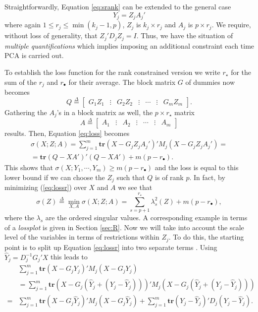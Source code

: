 \documentclass[article]{Z}
\newcommand{\defi}{\mathop{=}\limits^{\Delta}}
\begin{document}
Straightforwardly, Equation \ref{eq:srank} can be extended to the general case 
\begin{equation}
\label{E:res}
Y_j=Z_jA_j'
\end{equation}
where again $1 \leq r_j \leq \min{(k_j-1,p)}$, $Z_j$ is $k_j \times r_j$ and $A_j$ is $p \times r_j$. We require, without loss of generality, that
$Z_j'D_j^{}Z_j^{}=I$. Thus, we have the situation of \emph{multiple quantifications} which implies imposing an additional constraint each time PCA is carried out. 

To establish the loss function for the rank constrained version we write $r_\star$ for the sum of the $r_j$ and $r_\bullet$ for their average. The block matrix $G$ of dummies now becomes 
\begin{equation}
Q\defi\begin{bmatrix}G_1Z_1&\vdots&G_2Z_2&\vdots&\cdots&\vdots&G_mZ_m\end{bmatrix}.
\end{equation}
Gathering the $A_j$'s in a block matrix as well, the $p \times r_\star$ matrix
\begin{equation}
A\defi\begin{bmatrix}A_1&\vdots&A_2&\vdots&\cdots&\vdots&A_m\end{bmatrix}
\end{equation}
results. Then, Equation \ref{eq:loss} becomes
\begin{eqnarray}
\label{eq:lossr}
\sigma(X;Z;A)=
\sum_{j=1}^m\mathbf{tr}(X-G_jZ_j^{}A_j')'M_j(X-G_jZ_j^{}A_j')=\nonumber \\
=\mathbf{tr}(Q-XA')'(Q-XA')+m(p-r_\bullet).
\end{eqnarray}
This shows that $\sigma(X;Y_1,\cdots,Y_m)\geq m(p-r_\bullet)$ and the loss is equal to
this lower bound if we can choose the $Z_j$ such that $Q$ is of rank $p$. In fact, by
minimizing (\ref{eq:lossr}) over $X$ and $A$ we see that
\begin{equation}
\sigma(Z)\defi\min_{X,A}\sigma(X;Z;A)=
\sum_{s=p+1}^{r_\star}\lambda_s^2(Z)+m(p-r_\bullet),
\end{equation}
where the $\lambda_s$ are the ordered singular values. A corresponding example in terms of a \emph{lossplot} is given in Section \ref{sec:R}.
Now we will take into account the scale level of the variables in terms of restrictions within $Z_j$. To do this, the starting point is to split up Equation \ref{eq:lossr} into two separate terms \citep{Gifi:90,Michailidis+deLeeuw:98}. Using \(\hat Y_j=D_j^{-1}G_j'X\) this leads to 
\begin{eqnarray}
 & \sum_{j=1}^m \mathbf{tr}(X-G_jY_j)'M_j(X-G_jY_j) & \nonumber \\
& = \sum_{j=1}^m \mathbf{tr}(X-G_j(\hat Y_j + (Y_j - \hat Y_j)))'M_j(X-G_j(\hat Y_j + (Y_j - \hat Y_j))) & \nonumber \\
= & \sum_{j=1}^m\mathbf{tr}(X-G_j\hat Y_j)'M_j(X-G_j\hat Y_j)+\sum_{j=1}^m \mathbf{tr}(Y_j-\hat Y_j)'D_j(Y_j-\hat Y_j). &
\end{eqnarray}
\end{document}
